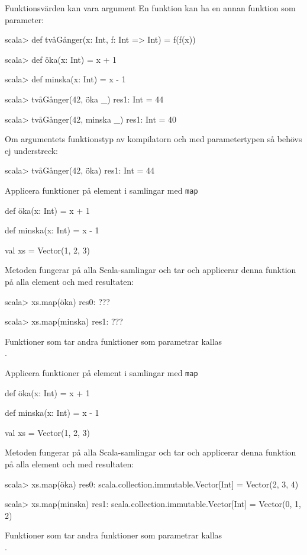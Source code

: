 \begin{Slide}{Funktionsvärden kan vara argument}
En funktion kan ha en annan funktion som parameter:
\begin{REPL}
scala> def tvåGånger(x: Int, f: Int => Int) = f(f(x))

scala> def öka(x: Int) = x + 1

scala> def minska(x: Int) = x - 1

scala> tvåGånger(42, öka _)
res1: Int = 44

scala> tvåGånger(42, minska _)
res1: Int = 40
\end{REPL}
Om argumentets funktionstyp  av kompilatorn och  med parametertypen så behövs ej understreck: \\
\begin{REPL}
scala> tvåGånger(42, öka)
res1: Int = 44
\end{REPL}
\end{Slide}



\begin{Slide}{Applicera funktioner på element i samlingar med \texttt{map}}\SlideFontSmall
\begin{Code}
def öka(x: Int) = x + 1

def minska(x: Int) = x - 1

val xs = Vector(1, 2, 3)
\end{Code}
\pause
Metoden  fungerar på alla Scala-samlingar och tar  och applicerar denna funktion på alla element och  med resultaten:
\begin{REPL}
scala> xs.map(öka)
res0: ???

scala> xs.map(minska)
res1: ???
\end{REPL}
Funktioner som tar andra funktioner som parametrar kallas \\ .
\end{Slide}


\begin{Slide}{Applicera funktioner på element i samlingar med \texttt{map}}\SlideFontSmall
\begin{Code}
def öka(x: Int) = x + 1

def minska(x: Int) = x - 1

val xs = Vector(1, 2, 3)
\end{Code}
Metoden  fungerar på alla Scala-samlingar och tar  och applicerar denna funktion på alla element och  med resultaten:
\begin{REPL}
scala> xs.map(öka)
res0: scala.collection.immutable.Vector[Int] = Vector(2, 3, 4)

scala> xs.map(minska)
res1: scala.collection.immutable.Vector[Int] = Vector(0, 1, 2)
\end{REPL}
Funktioner som tar andra funktioner som parametrar kallas \\ .
\end{Slide}

